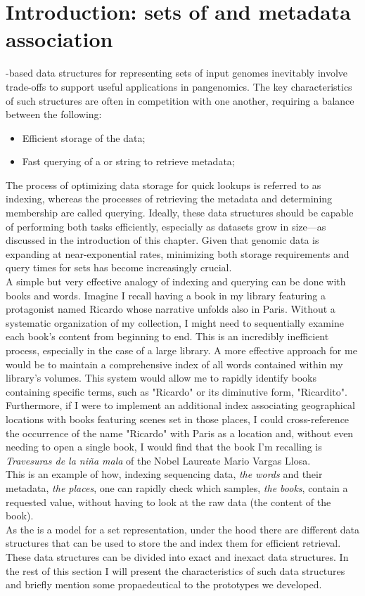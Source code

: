 \section{Introduction: sets of \kmers and metadata association}
\kmer-based data structures  for representing sets of input genomes inevitably involve trade-offs to support useful applications in pangenomics.  The key characteristics of such structures are often in competition with one another, requiring a balance between the following:
\begin{itemize}
	\item Efficient storage of the data;
	\item Fast querying of a \kmer or string to retrieve metadata;
\end{itemize}
The process of optimizing data storage for quick lookups is referred to as indexing, whereas the processes of retrieving the metadata and determining membership are called querying. Ideally, these data structures should be capable of performing both tasks efficiently, especially as datasets grow in size—as discussed in the introduction of this chapter. Given that genomic data is expanding at near-exponential rates, minimizing both storage requirements and query times for \kmer sets has become increasingly crucial.\\
A simple but very effective analogy of indexing and querying can be done with books and words.
Imagine I recall having a book in my library featuring a protagonist named Ricardo whose narrative unfolds also in Paris. Without a systematic organization of my collection, I might need to sequentially examine each book's content from beginning to end. This is an incredibly inefficient process, especially in the case of a large library. A more effective approach for me would be to maintain a comprehensive index of all words contained within my library's volumes. This system would allow me to rapidly identify books containing specific terms, such as "Ricardo" or its diminutive form, "Ricardito". Furthermore, if I were to implement an additional index associating geographical locations with books featuring scenes set in those places, I could cross-reference the occurrence of the name "Ricardo" with Paris as a location and, without even needing to open a single book, I would find that the book I'm recalling is \emph{Travesuras de la niña mala} of the Nobel Laureate Mario Vargas Llosa.\\
This is an example of how, indexing sequencing data, \emph{the words} and their metadata, \emph{the places}, one can rapidly check which samples, \emph{the books}, contain a requested value, without having to look at the raw data (the content of the book).\\
As the \dbg is a model for a \kmer set representation, under the hood there are different data structures that can be used to store the \kmers and index them for efficient retrieval. These data structures can be divided into exact and inexact data structures. In the rest of this section I will present the characteristics of such data structures and briefly mention some propaedeutical to the prototypes we developed.

